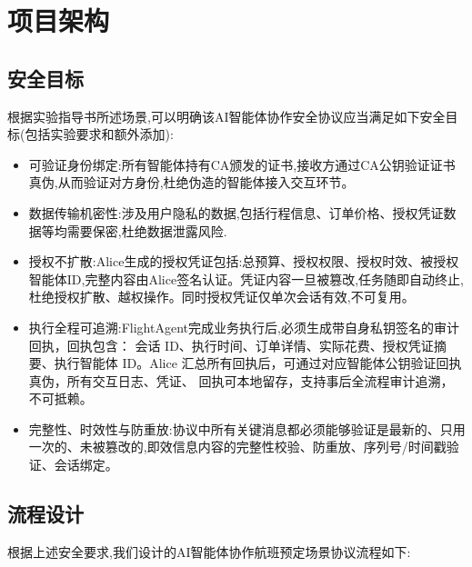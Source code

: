\section{项目架构}
\subsection{安全目标}
根据实验指导书所述场景,可以明确该AI智能体协作安全协议应当满足如下安全目标(包括实验要求和额外添加):
\begin{itemize}
    \item [1.] 可验证身份绑定:所有智能体持有CA颁发的证书,接收方通过CA公钥验证证书真伪,从而验证对方身份,杜绝伪造的智能体接入交互环节。
    \item [2.]数据传输机密性:涉及用户隐私的数据,包括行程信息、订单价格、授权凭证数据等均需要保密,杜绝数据泄露风险.
    \item [3.]授权不扩散:Alice生成的授权凭证包括:总预算、授权权限、授权时效、被授权智能体ID,完整内容由Alice签名认证。凭证内容一旦被篡改,任务随即自动终止,杜绝授权扩散、越权操作。同时授权凭证仅单次会话有效,不可复用。
    \item [4.]执行全程可追溯:FlightAgent完成业务执行后,必须生成带自身私钥签名的审计回执，回执包含：
会话 ID、执行时间、订单详情、实际花费、授权凭证摘要、执行智能体 ID。Alice
汇总所有回执后，可通过对应智能体公钥验证回执真伪，所有交互日志、凭证、
回执可本地留存，支持事后全流程审计追溯，不可抵赖。
    \item [5.] 完整性、时效性与防重放:协议中所有关键消息都必须能够验证是最新的、只用一次的、未被篡改的,即效信息内容的完整性校验、防重放、序列号/时间戳验证、会话绑定。
\end{itemize}

\subsection{流程设计}
根据上述安全要求,我们设计的AI智能体协作航班预定场景协议流程如下:

